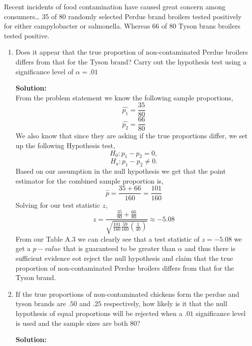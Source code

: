 \documentclass[12pt]{article}
\makeatletter
\theoremstyle{homework}
\newenvironment{exercise}[1]
{\def\@currentlabel{#1}\exercisecore}
{\endexercisecore}
\newcommand{\localhead}[1]{\par\smallskip\noindent\textbf{#1}\nobreak\\}%
\newcommand\solution{\localhead{Solution:}}
\makeatother
\begin{document}
\begin{exercise}{9.50} Recent incidents of food contamination have caused great concern among consumers\dots
  35 of 80 randomly selected Perdue brand broilers tested positively for either campylobacter or salmonella. Whereas
  66 of 80 Tyson brans broilers tested positive. \\
\begin{enumerate}
  \item Does it appear that the true proportion of non-contaminated Perdue broilers differs from that for the 
  Tyson brand? Carry out the hypothesis test using a significance level of $\alpha = .01$\\ 
  \solution From the problem statement we know the following sample proportions, 
  \begin{equation*}
    \hat{p_1} = \dfrac{35}{80}
  \end{equation*} 
  \begin{equation*}
    \hat{p_2} = \dfrac{66}{80}
  \end{equation*} 
  We also know that since they are asking if the true proportions differ, we set up the following Hypothesis test,
  \begin{equation*}
    H_0: p_1 - p_2 = 0,
  \end{equation*}
  \begin{equation*}
    H_a: p_1 - p_2 \neq 0.
  \end{equation*}
  Based on our assumption in the null hypothesis we get that the point estimator for the combined sample proportion is,
  \begin{equation*}
    \hat{p} = \dfrac{35 + 66}{160} = \dfrac{101}{160}
  \end{equation*}
  Solving for our test statistic $z$,
  \begin{equation*}
    z = \dfrac{ \frac{35}{80}   + \frac{66}{80}   }{\sqrt{ \frac{101}{160}\frac{59}{160} (\frac{1}{40})}} \approx -5.08 
  \end{equation*}  
  From our Table A.3 we can clearly see that a test statistic of $z = -5.08$ we get a $p-value$ that is guaranteed to be 
  greater than $\alpha$ and thus there is sufficient evidence eot reject the null hypothesis and claim that 
  the true proportion of non-contaminated Perdue broilers differs from that for the 
  Tyson brand.
  \vspace{.25in}



  \item If the true proportions of non-contaminated chickens form the perdue and tyson brands are $.50$ and $.25$
  respectively, how likely is it that the null hypothesis of equal proportions will be rejected when a $.01$ significance
  level is used and the sample sizes are both 80?\\
  \solution 



\end{enumerate}
\end{exercise}
\end{document}

